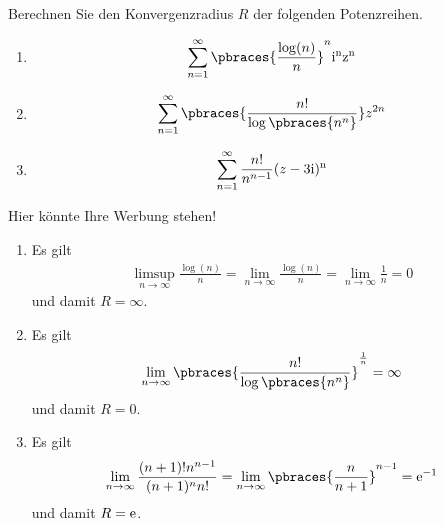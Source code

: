 \begin{exercise}
    Berechnen Sie den Konvergenzradius $R$ der folgenden Potenzreihen. 
    \begin{enumerate}[label = \alph*)]
        \item 
        \begin{align*}
            \sum_{n = 1}^\infty \pbraces{\frac{\log(n)}{n}}^n \rm{i}^n z^n
        \end{align*}
        \item 
        \begin{align*}
            \sum_{n = 1}^\infty \pbraces{\frac{n!}{\log\pbraces{n^n}}} z^{2n}    
        \end{align*}
        \item 
        \begin{align*}
            \sum_{n = 1}^\infty \frac{n!}{n^{n-1}}(z - 3\rm{i})^n
        \end{align*}
    \end{enumerate}
\end{exercise}

\begin{solution}
    Hier könnte Ihre Werbung stehen!
    \begin{enumerate}[label = \alph*)]
        \item Es gilt 
            \begin{align*}
                \limsup_{n \to \infty} \frac{\log(n)}{n} = \lim_{n \to \infty} \frac{\log(n)}{n} = \lim_{n \to \infty} \frac{1}{n} = 0
            \end{align*}
            und damit $R = \infty$.
        \item Es gilt
            \begin{align*}
                \lim_{n \to \infty} \pbraces{\frac{n!}{\log\pbraces{n^n}}}^{\frac{1}{n}} = \infty
            \end{align*}
            und damit $R = 0$.
        \item Es gilt
            \begin{align*}
                \lim_{n \to \infty} \frac{(n + 1)! n^{n - 1}}{(n + 1)^n n!} = \lim_{n \to \infty} \pbraces{\frac{n}{n + 1}}^{n - 1} = \rm{e}^{-1}
            \end{align*}
            und damit $R = \rm{e}$.
    \end{enumerate}
\end{solution}
